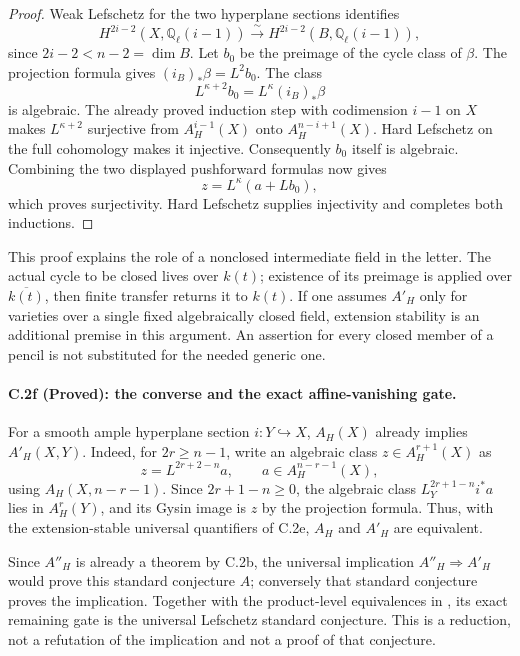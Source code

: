 \begin{proof}
Weak Lefschetz for the two hyperplane sections identifies
\[
 H^{2i-2}(X,\mathbb Q_\ell(i-1))
       \xrightarrow{\sim}
 H^{2i-2}(B,\mathbb Q_\ell(i-1)),
\]
since $2i-2<n-2=\dim B$. Let $b_0$ be the preimage of the cycle
class of $\beta$. The projection formula gives
$(i_B)_*\beta=L^2b_0$. The class
\[
 L^{\kappa+2}b_0=L^\kappa(i_B)_*\beta
\]
is algebraic. The already proved induction step with codimension
$i-1$ on $X$ makes $L^{\kappa+2}$ surjective from
$A_H^{i-1}(X)$ onto $A_H^{n-i+1}(X)$. Hard Lefschetz on the full
cohomology makes it injective. Consequently $b_0$ itself is algebraic.
Combining the two displayed pushforward formulas now gives
\[
                 z=L^\kappa(a+L b_0),
\]
which proves surjectivity. Hard Lefschetz supplies injectivity and
completes both inductions.
\end{proof}

This proof explains the role of a nonclosed intermediate field in the
letter. The actual cycle to be closed lives over $k(t)$; existence of
its preimage is applied over $\overline{k(t)}$, then finite transfer
returns it to $k(t)$. If one assumes $A'_H$ only for varieties over a
single fixed algebraically closed field, extension stability is an
additional premise in this argument. An assertion for every closed
member of a pencil is not substituted for the needed generic one.

\paragraph{C.2f (Proved): the converse and the exact affine-vanishing gate.}
For a smooth ample hyperplane section $i:Y\hookrightarrow X$,
$A_H(X)$ already implies $A'_H(X,Y)$. Indeed, for $2r\ge n-1$,
write an algebraic class $z\in A_H^{r+1}(X)$ as
\[
 z=L^{2r+2-n}a,\qquad a\in A_H^{n-r-1}(X),
\]
using $A_H(X,n-r-1)$. Since $2r+1-n\ge0$, the algebraic class
$L_Y^{2r+1-n}i^*a$ lies in $A_H^r(Y)$, and its Gysin image is $z$
by the projection formula. Thus, with the extension-stable universal
quantifiers of C.2e, $A_H$ and $A'_H$ are equivalent.

Since $A''_H$ is already a theorem by C.2b, the universal implication
$A''_H\Rightarrow A'_H$ would prove this standard conjecture $A$;
conversely that standard conjecture proves the implication. Together
with the product-level equivalences in
\citet[Corollary 2.14]{cyKleiman1968}, its exact remaining gate is the
universal Lefschetz standard conjecture. This is a reduction, not a
refutation of the implication and not a proof of that conjecture.

